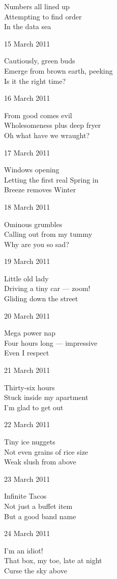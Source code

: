 \documentclass[12pt]{article}
\begin{document}
Numbers all lined up \\
Attempting to find order \\
In the data sea

15 March 2011

Cautiously, green buds \\
Emerge from brown earth, peeking \\
Is it the right time?

16 March 2011

From good comes evil \\
Wholesomeness plus deep fryer \\
Oh what have we wraught?

17 March 2011

Windows opening \\
Letting the first real Spring in \\
Breeze removes Winter

\newpage

18 March 2011

Ominous grumbles \\
Calling out from my tummy \\
Why are you so sad?

19 March 2011

Little old lady \\
Driving a tiny car --- zoom! \\
Gliding down the street

20 March 2011

Mega power nap \\
Four hours long --- impressive \\
Even I respect

21 March 2011

Thirty-six hours \\
Stuck inside my apartment \\
I'm glad to get out

22 March 2011

Tiny ice nuggets \\
Not even grains of rice size \\
Weak slush from above

23 March 2011

Infinite Tacos \\
Not just a buffet item \\
But a good band name

24 March 2011

I'm an idiot! \\
That box, my toe, late at night \\
Curse the sky above
\end{document}

